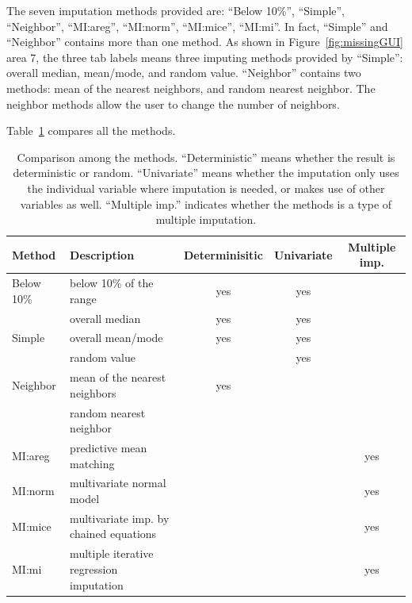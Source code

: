 \documentclass[article]{jss}
\begin{document}
The seven imputation methods provided are: 
``Below 10\%'', ``Simple'', ``Neighbor'', ``MI:areg'', ``MI:norm'', ``MI:mice'', ``MI:mi''. 
In fact, ``Simple'' and ``Neighbor'' contains more than one method. As shown in Figure~\ref{fig:missingGUI} area 7, the three tab labels means three imputing methods provided by ``Simple'': overall median, mean/mode, and random value. ``Neighbor'' contains two methods: mean of the nearest neighbors, and random nearest neighbor. The neighbor methods allow the user to change the number of neighbors.

Table~\ref{tab:compare-methods} compares all the methods.

\begin{center}
\begin{table}[h]
\begin{centering}
\begin{tabular}{l|l|c|c|c}
\hline 
\textbf{\scriptsize{Method}} & \textbf{\scriptsize{Description}} & \textbf{\scriptsize{Determinisitic}} & \textbf{\scriptsize{Univariate}} & \textbf{\scriptsize{Multiple imp.}}\tabularnewline
\hline 
{\scriptsize{Below 10\%}} & {\scriptsize{below 10\% of the range}} & {\scriptsize{yes}} & {\scriptsize{yes}} & \tabularnewline
\hline 
 & {\scriptsize{overall median}} & {\scriptsize{yes}} & {\scriptsize{yes}} & \tabularnewline
{\scriptsize{Simple}} & {\scriptsize{overall mean/mode}} & {\scriptsize{yes}} & {\scriptsize{yes}} & \tabularnewline 
 & {\scriptsize{random value}} &  & {\scriptsize{yes}} & \tabularnewline
\hline
{\scriptsize{Neighbor}} & {\scriptsize{mean of the nearest neighbors}} & {\scriptsize{yes}} &  & \tabularnewline
 & {\scriptsize{random nearest neighbor}} &  &  & \tabularnewline
\hline 
{\scriptsize{MI:areg}} & {\scriptsize{predictive mean matching}} &  &  & {\scriptsize{yes}}\tabularnewline
\hline 
{\scriptsize{MI:norm}} & {\scriptsize{multivariate normal model}} &  &  & {\scriptsize{yes}}\tabularnewline
\hline 
{\scriptsize{MI:mice}} & {\scriptsize{multivariate imp. by chained equations}} &  &  & {\scriptsize{yes}}\tabularnewline
\hline 
{\scriptsize{MI:mi}} & {\scriptsize{multiple iterative regression imputation}} &  &  & {\scriptsize{yes}}\tabularnewline
\hline 
\end{tabular}
\par\end{centering}
\caption{Comparison among the methods. ``Deterministic''
means whether the result is deterministic or random. ``Univariate''
means whether the imputation only uses the individual variable where
imputation is needed, or makes use of other variables as well. ``Multiple
imp.'' indicates whether the methods is a type of multiple imputation.}
\label{tab:compare-methods}
\end{table}
\par\end{center}
\end{document}
